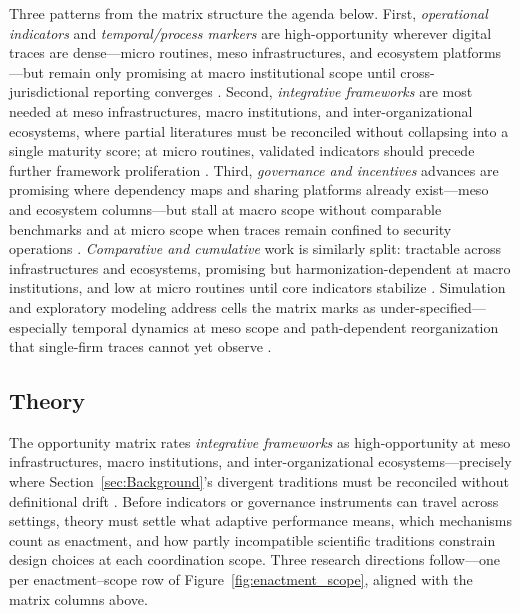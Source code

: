 

Three patterns from the matrix structure the agenda below. First, \emph{operational indicators} and \emph{temporal/process markers} are high-opportunity wherever digital traces are dense---micro routines, meso infrastructures, and ecosystem platforms---but remain only promising at macro institutional scope until cross-jurisdictional reporting converges \autocite{bcbs2021operational,european2022regulation,nist2024csf}. Second, \emph{integrative frameworks} are most needed at meso infrastructures, macro institutions, and inter-organizational ecosystems, where partial literatures must be reconciled without collapsing into a single maturity score; at micro routines, validated indicators should precede further framework proliferation \autocite{hillmann2021organizational}. Third, \emph{governance and incentives} advances are promising where dependency maps and sharing platforms already exist---meso and ecosystem columns---but stall at macro scope without comparable benchmarks and at micro scope when traces remain confined to security operations \autocite{skopik2016problem}. \emph{Comparative and cumulative} work is similarly split: tractable across infrastructures and ecosystems, promising but harmonization-dependent at macro institutions, and low at micro routines until core indicators stabilize \autocite{francis2014metric}. Simulation and exploratory modeling address cells the matrix marks as under-specified---especially temporal dynamics at meso scope and path-dependent reorganization that single-firm traces cannot yet observe \autocite{dawson2011agentbased,kwakkel2016comparing}.

\subsection{Theory}

The opportunity matrix rates \emph{integrative frameworks} as high-opportunity at meso infrastructures, macro institutions, and inter-organizational ecosystems---precisely where Section~\ref{sec:Background}'s divergent traditions must be reconciled without definitional drift \autocite{woods2015four,hillmann2021organizational}. Before indicators or governance instruments can travel across settings, theory must settle what adaptive performance means, which mechanisms count as enactment, and how partly incompatible scientific traditions constrain design choices at each coordination scope. Three research directions follow---one per enactment--scope row of Figure~\ref{fig:enactment_scope}, aligned with the matrix columns above.

